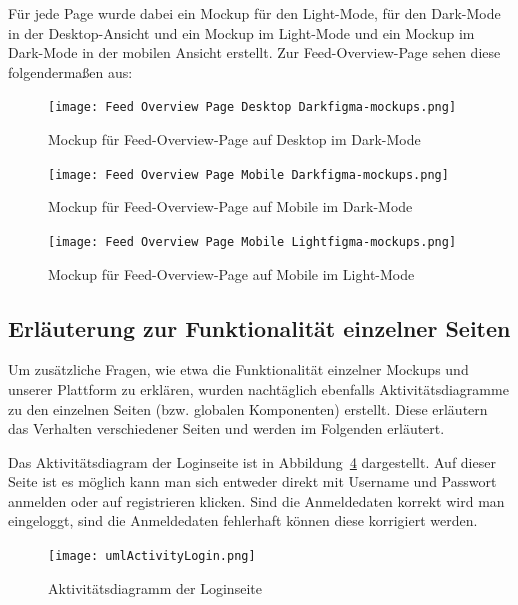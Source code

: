 Für jede Page wurde dabei ein Mockup für den Light-Mode, 
für den Dark-Mode in der Desktop-Ansicht und ein Mockup im 
Light-Mode und ein Mockup im Dark-Mode in der mobilen Ansicht 
erstellt. Zur Feed-Overview-Page sehen diese folgendermaßen aus:

\begin{figure}[H]
    \texttt{[image: Feed Overview Page Desktop Darkfigma-mockups.png]}
    \caption{Mockup für Feed-Overview-Page auf Desktop im Dark-Mode}
    \label{fig:Feed Overview Page Dark Desktop}
\end{figure}

\begin{figure}[H]
    \begin{center}
        \texttt{[image: Feed Overview Page Mobile Darkfigma-mockups.png]}
    \end{center}
    \caption{Mockup für Feed-Overview-Page auf Mobile im Dark-Mode}
    \label{fig:Feed Overview Page Light Mobile}
\end{figure}


\begin{figure}[H]
    \begin{center}
        \texttt{[image: Feed Overview Page Mobile Lightfigma-mockups.png]}
    \end{center}
    \caption{Mockup für Feed-Overview-Page auf Mobile im Light-Mode}
    \label{fig:Feed Overview Page Light Mobile}
\end{figure}


\subsection{Erläuterung zur Funktionalität einzelner Seiten}

Um zusätzliche Fragen, wie etwa die Funktionalität einzelner Mockups und unserer Plattform zu erklären, wurden nachtäglich ebenfalls Aktivitätsdiagramme zu den einzelnen Seiten (bzw. globalen Komponenten) erstellt.
Diese erläutern das Verhalten verschiedener Seiten und werden im Folgenden erläutert.

Das Aktivitätsdiagram der Loginseite ist in Abbildung~\ref{fig:umlActivityLogin.png} dargestellt.
Auf dieser Seite ist es möglich kann man sich entweder direkt mit Username und Passwort anmelden oder auf registrieren klicken.
Sind die Anmeldedaten korrekt wird man eingeloggt, sind die Anmeldedaten fehlerhaft können diese korrigiert werden.
\begin{figure}
    \texttt{[image: umlActivityLogin.png]}
    \caption{Aktivitätsdiagramm der Loginseite}
    \label{fig:umlActivityLogin.png}
\end{figure}

